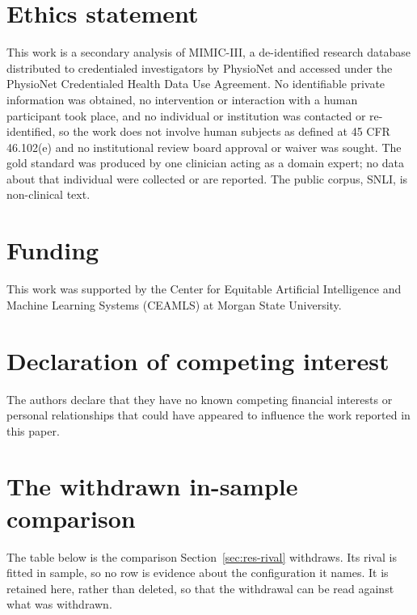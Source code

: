 \documentclass[review]{elsarticle}
\begin{document}
\section*{Ethics statement}

This work is a secondary analysis of MIMIC-III, a de-identified research
database distributed to credentialed investigators by PhysioNet and accessed
under the PhysioNet Credentialed Health Data Use Agreement. No identifiable
private information was obtained, no intervention or interaction with a human
participant took place, and no individual or institution was contacted or
re-identified, so the work does not involve human subjects as
defined at 45 CFR 46.102(e) and no institutional review board approval or
waiver was sought. The gold standard was produced by one clinician acting as
a domain expert; no data about that individual were collected or are
reported. The public corpus, SNLI, is
non-clinical text.

\section*{Funding}

This work was supported by the Center for Equitable Artificial Intelligence and
Machine Learning Systems (CEAMLS) at Morgan State University.

\section*{Declaration of competing interest}

The authors declare that they have no known competing financial interests or
personal relationships that could have appeared to influence the work reported
in this paper.

\appendix
\setcounter{table}{0}
\setcounter{figure}{0}
\section{The withdrawn in-sample comparison}
\label{sec:app-delong}

The table below is the comparison Section~\ref{sec:res-rival} withdraws. Its rival is fitted in sample, so no row is evidence about the configuration it names. It is retained here, rather than deleted, so that the withdrawal can be read against what was withdrawn.
\end{document}
